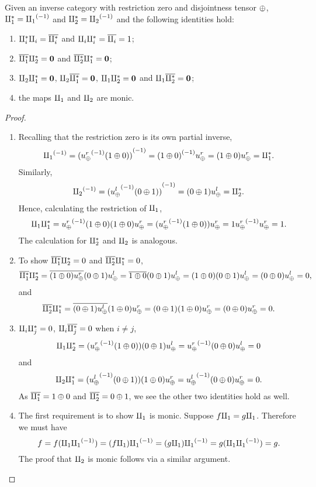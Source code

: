 \begin{lemma}\label{lem:tensor_identities}
  Given an inverse category \X with restriction zero and disjointness tensor $\oplus$,
  $\amalg_{1}^{*} = {\amalg_{1}}^{(-1)}$ and $\amalg_{2}^{*} = {\amalg_{2}}^{(-1)}$ and the following identities hold:
  \begin{enumerate}[{(}i{)}]
    \item $\amalg_{i}^{*} \amalg_{i} = \overline{\amalg_{i}^{*}}$ and $\amalg_{i}\amalg_{i}^{*} = \overline{\amalg_{i}} = 1$;\label{lemitem:disjointness_tensor_identities_1}
    \item $\overline{\amalg_{1}^{*}} \amalg_{2}^{*} = \mathbf{0}$ and $\overline{\amalg_{2}^{*}} \amalg_{1}^{*} = \mathbf{0}$;\label{lemitem:disjointness_tensor_identities_2}
    \item $\amalg_{2} \amalg_{1}^{*} = \mathbf{0}$, $\amalg_{2} \overline{\amalg_{1}^{*}} = \mathbf{0}$,  $\amalg_{1} \amalg_{2}^{*} = \mathbf{0}$ and
      $\amalg_{1} \overline{\amalg_{2}^{*}} = \mathbf{0}$;\label{lemitem:disjointness_tensor_identities_3}
    \item the maps $\amalg_{1}$ and $\amalg_{2}$ are monic.\label{lemitem:disjointness_tensor_identities_4}
  \end{enumerate}
\end{lemma}
\begin{proof}
  \prepprooflist
  \begin{enumerate}[{(}i{)}]
  \item Recalling that the restriction zero is its own partial inverse,
    \[
      {\amalg_{1}}^{(-1)} = {({u_{\oplus}^r}^{(-1)}(1\oplus0))}^{(-1)}  = {(1\oplus0)}^{(-1)}u_{\oplus}^r = (1\oplus0)u_{\oplus}^r = \amalg_{1}^{*}.
     \]
     Similarly,
     \[
       {\amalg_{2}}^{(-1)} = {({u_{\oplus}^l}^{(-1)}(0\oplus1))}^{(-1)} = (0\oplus1)u_{\oplus}^l = \amalg_{2}^{*}.
     \]
     Hence, calculating the restriction of $\amalg_{1}$,
     \begin{equation*}
       \amalg_{1} \amalg_{1}^{*}   = {u_{\oplus}^r}^{(-1)}(1\oplus0) (1\oplus0)u_{\oplus}^r
       = ({u_{\oplus}^r}^{(-1)}(1\oplus0))u_{\oplus}^r = 1 {u_{\oplus}^r}^{(-1)}u_{\oplus}^r= 1.
     \end{equation*}
     The calculation for $\amalg_{2}^{*}$ and $\amalg_{2}$ is analogous.
  \item To show $\overline{\amalg_{1}^{*}} \amalg_{2}^{*} = 0$ and  $\overline{\amalg_{2}^{*}} \amalg_{1}^{*} = 0$,
    \[
      \overline{\amalg_{1}^{*}} \amalg_{2}^{*}  = \overline{(1\oplus0)u_{\oplus}^r}(0\oplus1)u_{\oplus}^l = \overline{1\oplus0} (0 \oplus 1)u_{\oplus}^l = (1\oplus0) (0\oplus1)u_{\oplus}^l= (0\oplus0)u_{\oplus}^l  = 0,
    \]
    and
    \[
      \overline{\amalg_{2}^{*}} \amalg_{1}^{*}  = \overline{(0\oplus1)u_{\oplus}^l}(1\oplus0)u_{\oplus}^r = (0\oplus1) (1\oplus0)u_{\oplus}^r= (0\oplus0)u_{\oplus}^r= 0.
    \]
  \item  $\amalg_{i} \amalg_{j}^{*} = 0$, $\amalg_{i} \overline{\amalg_{j}^{*}} = 0$ when $i\ne j$,
    \[
      \amalg_{1} \amalg_{2}^{*} = ({u_{\oplus}^r}^{(-1)}(1\oplus0))(0\oplus1) u_{\oplus}^l= {u_{\oplus}^r}^{(-1)}(0\oplus0)u_{\oplus}^l= 0
    \]
    and
    \[
     \amalg_{2} \amalg_{1}^{*} = ({u_{\oplus}^l}^{(-1)}(0\oplus1))(1\oplus0) u_{\oplus}^r= {u_{\oplus}^l}^{(-1)}(0\oplus0)u_{\oplus}^r= 0.
    \]
    As $\overline{\amalg_{1}^{*}} = 1\oplus0$ and $\overline{\amalg_{2}^{*}} = 0 \oplus1$, we see the other two identities hold as well.
  \item The first requirement is to show $\amalg_{1}$ is  monic. Suppose $f\amalg_{1} = g\amalg_{1}$. Therefore we must have
    \[
      f = f (\amalg_{1} {\amalg_{1}}^{(-1)}) = (f \amalg_{1}) {\amalg_{1}}^{(-1)} = (g \amalg_{1}) {\amalg_{1}}^{(-1)} = g (\amalg_{1} {\amalg_{1}}^{(-1)}) = g.
    \]
    The proof that $\amalg_{2}$ is monic follows via a similar argument.
  \end{enumerate}
\end{proof}

